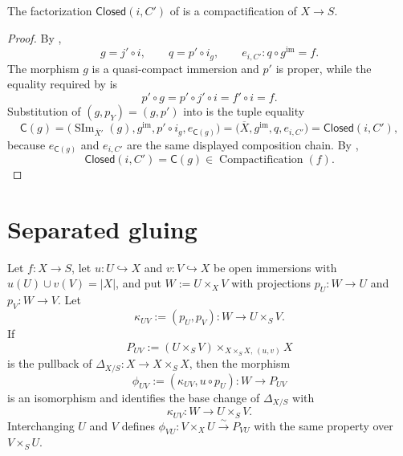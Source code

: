 \begin{proposition}
  \label{prop:nagata-closed-subscheme-compactifiable}
  \lean{}

  The factorization $\mathsf{Closed}(i,C')$ of
   is a compactification
  of $X\to S$.
\end{proposition}

\begin{proof}
  By ,
  \[
    g=j'\circ i,
    \qquad
    q=p'\circ i_g,
    \qquad
    e_{i,C'}\colon q\circ g^{\mathrm{im}}=f.
  \]
  The morphism $g$ is a quasi-compact immersion and $p'$ is proper, while
  the equality required by
   is
  \[
    p'\circ g
      =p'\circ j'\circ i
      =f'\circ i=f.
  \]
  Substitution of $(g,p_Y)=(g,p')$ into
   is the tuple equality
  \[
    \mathsf C(g)
      =\bigl(\operatorname{SIm}_{\overline X'}(g),
        g^{\mathrm{im}},p'\circ i_g,e_{\mathsf C(g)}\bigr)
      =\bigl(\overline X,g^{\mathrm{im}},q,e_{i,C'}\bigr)
      =\mathsf{Closed}(i,C'),
  \]
  because $e_{\mathsf C(g)}$ and $e_{i,C'}$ are the same displayed
  composition chain.  By
  ,
  \[
    \mathsf{Closed}(i,C')=\mathsf C(g)
      \in\operatorname{Compactification}(f).
  \]
\end{proof}

\section{Separated gluing}

\begin{lemma}
  \label{lemma:nagata-diagonal-mixed-open}
  \lean{}

  Let $f\colon X\to S$, let $u\colon U\hookrightarrow X$ and
  $v\colon V\hookrightarrow X$ be open immersions with
  $u(U)\cup v(V)=|X|$, and put $W:=U\times_XV$ with projections
  $p_U\colon W\to U$ and $p_V\colon W\to V$.  Let
  \[
    \kappa_{UV}:=(p_U,p_V)\colon W\longrightarrow U\times_SV.
  \]
  If
  \[
    P_{UV}:=(U\times_SV)\times_{X\times_SX,\,(u,v)}X
  \]
  is the pullback of $\Delta_{X/S}\colon X\to X\times_SX$, then the morphism
  \[
    \phi_{UV}:=(\kappa_{UV},u\circ p_U)\colon W\longrightarrow P_{UV}
  \]
  is an isomorphism and identifies the base change of $\Delta_{X/S}$ with
  \[
    \kappa_{UV}\colon W\longrightarrow U\times_SV.
  \]
  Interchanging $U$ and $V$ defines
  $\phi_{VU}\colon V\times_XU\xrightarrow{\sim}P_{VU}$ with the same
  property over $V\times_SU$.
\end{lemma}

